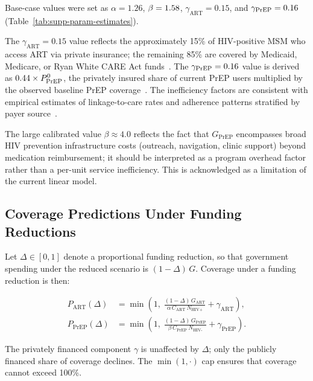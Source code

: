 \documentclass[preprint,12pt]{elsarticle}
\begin{document}
{Base-case values were set as $\alpha = 1.26$, $\beta = 1.58$,
$\gamma_{\text{ART}} = 0.15$, and $\gamma_{\text{PrEP}} = 0.16$
(Table~\ref{tab:supp-param-estimates}).

The $\gamma_{\text{ART}} = 0.15$ value reflects the approximately 15\% of
HIV-positive MSM who access ART via private insurance; the remaining 85\% are covered by
Medicaid, Medicare, or Ryan White CARE Act funds~\cite{KFF2023}.
The $\gamma_{\text{PrEP}} = 0.16$ value is derived as $0.44 \times P_{\text{PrEP}}^{0}$,
the privately insured share of current PrEP users multiplied by the observed baseline
PrEP coverage~\cite{CDCPrEP2022,prepcosts2018}.
The inefficiency factors are consistent with empirical estimates of linkage-to-care rates
and adherence patterns stratified by payer source~\cite{Yehia2014Continuum}.

The large calibrated value $\beta \approx 4.0$ reflects the fact that
$G_{\text{PrEP}}$ encompasses broad HIV prevention infrastructure costs (outreach,
navigation, clinic support) beyond medication reimbursement; it should be interpreted
as a program overhead factor rather than a per-unit service inefficiency.
This is acknowledged as a limitation of the current linear model.

\subsection{Coverage Predictions Under Funding Reductions}

Let $\Delta \in [0,1]$ denote a proportional funding reduction, so that government spending under the reduced scenario is $(1-\Delta)\,G$. Coverage under a funding reduction is then:

\begin{align}
P_{\text{ART}}(\Delta)  &= \min\!\left(1,\;
    \frac{(1-\Delta)\,G_{\text{ART}}}{\alpha\, C_{\text{ART}}\, N_{\text{HIV+}}}
    + \gamma_{\text{ART}}\right), \label{eq:supp-PART-delta} \\[6pt]
P_{\text{PrEP}}(\Delta) &= \min\!\left(1,\;
    \frac{(1-\Delta)\,G_{\text{PrEP}}}{\beta\, C_{\text{PrEP}}\, N_{\text{HIV-}}}
    + \gamma_{\text{PrEP}}\right). \label{eq:supp-PPrEP-delta}
\end{align}

The privately financed component $\gamma$ is unaffected by $\Delta$; only the publicly financed share of coverage declines. The $\min(1,\cdot)$ cap ensures that coverage cannot exceed 100\%.

}
\end{document}
